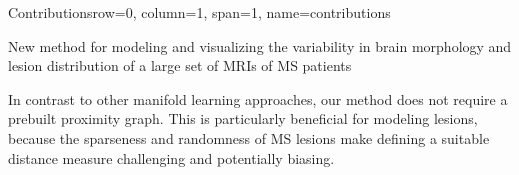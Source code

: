 \documentclass[%
landscape,paperwidth=42in,paperheight=48in,%
margin=2cm,
fontscale=0.295
]{baposter}
\begin{document}
\begin{poster}

\begin{headerblock}{Contributions}{row=0, column=1, span=1, name=contributions}
\begin{compactitem}

  \item New method for modeling and visualizing the variability in brain
  morphology and lesion distribution of a large set of MRIs of MS patients
  
  \item In contrast to other manifold learning approaches, our method does not
  require a prebuilt proximity graph. This is particularly beneficial for
  modeling lesions, because the sparseness and randomness of MS lesions make
  defining a suitable distance measure challenging and potentially biasing.

\end{compactitem}
\end{headerblock}




\end{poster}
\end{document}
